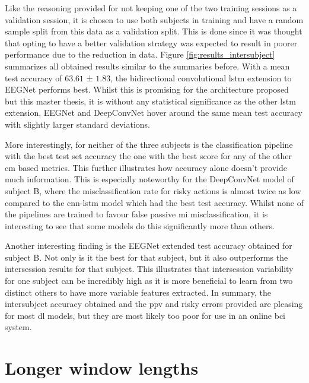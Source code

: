Like the reasoning provided for not keeping one of the two training sessions as a validation session, it is chosen to use both subjects in training and have a random sample split from this data as a validation split.
This is done since it was thought that opting to have a better validation strategy was expected to result in poorer performance due to the reduction in data.
Figure \ref{fig:results_intersubject} summarizes all obtained results similar to the summaries before.
With a mean test accuracy of $63.61$ ± $1.83$, the bidirectional convolutional \gls{lstm} extension to EEGNet performs best.
Whilst this is promising for the architecture proposed but this master thesis, it is without any statistical significance as the other \gls{lstm} extension, EEGNet and DeepConvNet hover around the same mean test accuracy with slightly larger standard deviations.

More interestingly, for neither of the three subjects is the classification pipeline with the best test set accuracy the one with the best score for any of the other \gls{cm} based metrics.
This further illustrates how accuracy alone doesn't provide much information.
This is especially noteworthy for the DeepConvNet model of subject B, where the misclassification rate for risky actions is almost twice as low compared to the \gls{cnn}-\gls{lstm} model which had the best test accuracy.
Whilst none of the pipelines are trained to favour false passive \gls{mi} misclassification, it is interesting to see that some models do this significantly more than others.

Another interesting finding is the EEGNet extended test accuracy obtained for subject B.
Not only is it the best for that subject, but it also outperforms the intersession results for that subject.
This illustrates that intersession variability for one subject can be incredibly high as it is more beneficial to learn from two distinct others to have more variable features extracted.
In summary, the intersubject accuracy obtained and the \gls{ppv} and risky errors provided are pleasing for most \gls{dl} models, but they are most likely too poor for use in an online \gls{bci} system.



\section{Longer window lengths}
\label{sec:evaluation_longer_window_lengths}

